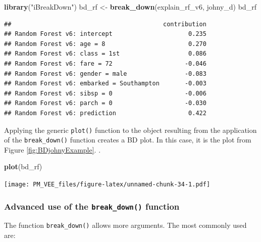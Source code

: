 \documentclass[12pt,]{krantz}
\newenvironment{Shaded}{\begin{snugshade}}{\end{snugshade}}
\newcommand{\KeywordTok}[1]{\textcolor[rgb]{0.13,0.29,0.53}{\textbf{#1}}}
\newcommand{\NormalTok}[1]{#1}
\newcommand{\StringTok}[1]{\textcolor[rgb]{0.31,0.60,0.02}{#1}}
\begin{document}
\begin{Shaded}
\begin{Highlighting}[]
\KeywordTok{library}\NormalTok{(}\StringTok{"iBreakDown"}\NormalTok{)}
\NormalTok{bd_rf <-}\StringTok{ }\KeywordTok{break_down}\NormalTok{(explain_rf_v6, johny_d)}
\NormalTok{bd_rf}
\end{Highlighting}
\end{Shaded}

\begin{verbatim}
##                                          contribution
## Random Forest v6: intercept                     0.235
## Random Forest v6: age = 8                       0.270
## Random Forest v6: class = 1st                   0.086
## Random Forest v6: fare = 72                    -0.046
## Random Forest v6: gender = male                -0.083
## Random Forest v6: embarked = Southampton       -0.003
## Random Forest v6: sibsp = 0                    -0.006
## Random Forest v6: parch = 0                    -0.030
## Random Forest v6: prediction                    0.422
\end{verbatim}

Applying the generic \texttt{plot()} function to the object resulting from the application of the \texttt{break\_down()} function creates a BD plot. In this case, it is the plot from Figure \ref{fig:BDjohnyExample}.
.

\begin{Shaded}
\begin{Highlighting}[]
\KeywordTok{plot}\NormalTok{(bd_rf) }
\end{Highlighting}
\end{Shaded}

\texttt{[image: PM\_VEE\_files/figure-latex/unnamed-chunk-34-1.pdf]}

\hypertarget{advanced-use-of-the-break_down-function}{%
\subsubsection{\texorpdfstring{Advanced use of the \texttt{break\_down()} function}{Advanced use of the break\_down() function}}\label{advanced-use-of-the-break_down-function}}

The function \texttt{break\_down()} allows more arguments. The most commonly used are:
\end{document}
